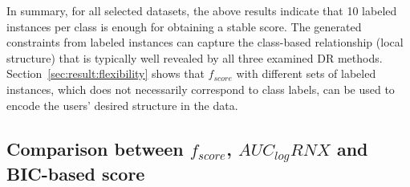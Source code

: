
In summary, for all selected datasets, the above results indicate that 10 labeled instances per class is enough for obtaining a stable score.
The generated constraints from labeled instances can capture the class-based relationship (local structure) that is typically well revealed by all three examined DR methods.
Section~\ref{sec:result:flexibility} shows that $f_{score}$ with different sets of labeled instances, which does not necessarily correspond to class labels,
can be used to encode the users' desired structure in the data.

\subsection{Comparison between $f_{score}$, $AUC_{log}RNX$ and BIC-based score}\label{sec:result:compare}

